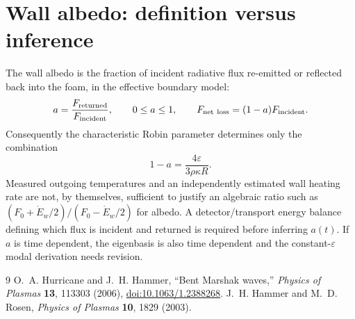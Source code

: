 \documentclass[11pt]{article}
\numberwithin{equation}{section}
\begin{document}
\section{Wall albedo: definition versus inference}
The wall albedo is the fraction of incident radiative flux re-emitted or reflected back into the foam, in the effective boundary model:
\begin{equation}a=\frac{F_{\rm returned}}{F_{\rm incident}},\qquad 0\le a\le1,\qquad
F_{\rm net\ loss}=(1-a)F_{\rm incident}.\end{equation}
Consequently the characteristic Robin parameter determines only the combination
\begin{equation}1-a=\frac{4\varepsilon}{3\rho\kappa R}.\end{equation}
Measured outgoing temperatures and an independently estimated wall heating rate are not, by themselves, sufficient to justify an algebraic ratio such as $(F_0+\dot E_w/2)/(F_0-\dot E_w/2)$ for albedo. A detector/transport energy balance defining which flux is incident and returned is required before inferring $a(t)$. If $a$ is time dependent, the eigenbasis is also time dependent and the constant-$\varepsilon$ modal derivation needs revision.

\begin{thebibliography}{9}
 O.~A. Hurricane and J.~H. Hammer, ``Bent Marshak waves,'' \emph{Physics of Plasmas} \textbf{13}, 113303 (2006), \href{https://doi.org/10.1063/1.2388268}{doi:10.1063/1.2388268}.
 J.~H. Hammer and M.~D. Rosen, \emph{Physics of Plasmas} \textbf{10}, 1829 (2003).
\end{thebibliography}
\end{document}

